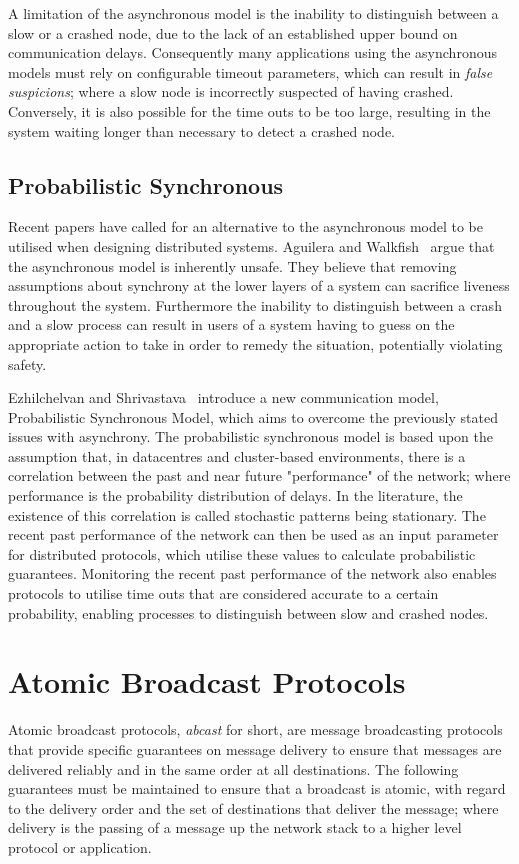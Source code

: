 	A limitation of the asynchronous model is the inability to distinguish between a slow or a crashed node, due to the lack of an established upper bound on communication delays.  Consequently many applications using the asynchronous models must rely on configurable timeout parameters, which can result in \emph{false suspicions}; where a slow node is incorrectly suspected of having crashed.  Conversely, it is also possible for the time outs to be too large, resulting in the system waiting longer than necessary to detect a crashed node.  
	
	\subsection{Probabilistic Synchronous}
	Recent papers have called for an alternative to the asynchronous model to be utilised when designing distributed systems. Aguilera and Walkfish~\cite{Aguilera:2009:NTA:1855568.1855571} argue that the asynchronous model is inherently unsafe. They believe that removing assumptions about synchrony at the lower layers of a system can sacrifice liveness throughout the system. Furthermore the inability to distinguish between a crash and a slow process can result in users of a system having to guess on the appropriate action to take in order to remedy the situation, potentially violating safety. 

Ezhilchelvan and Shrivastava~\cite{Ezhilchelvan:2010:LPR:1773912.1773927} introduce a new communication model, Probabilistic Synchronous Model, which aims to overcome the previously stated issues with asynchrony. The probabilistic synchronous model is based upon the assumption that, in datacentres and cluster-based environments, there is a correlation between the past and near future "performance" of the network; where performance is the probability distribution of delays. In the literature, the existence of this correlation is called stochastic patterns being stationary. The recent past performance of the network can then be used as an input parameter for distributed protocols, which utilise these values to calculate probabilistic guarantees. Monitoring the recent past performance of the network also enables protocols to utilise time outs that are considered accurate to a certain probability, enabling processes to distinguish between slow and crashed nodes. 


\section{Atomic Broadcast Protocols}
Atomic broadcast protocols, \emph{abcast} for short, are message broadcasting protocols that provide specific guarantees on message delivery to ensure that messages are delivered reliably and in the same order at all destinations.  The following guarantees must be maintained to ensure that a broadcast is atomic, with regard to the delivery order and the set of destinations that deliver the message; where delivery is the passing of a message up the network stack to a higher level protocol or application.  


